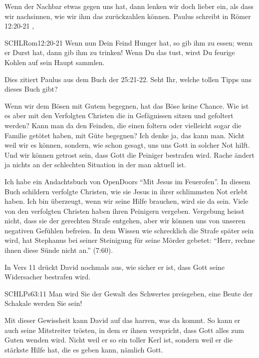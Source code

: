 \documentclass[14pt]{mybib}
\begin{document}
    \begin{otsblock}
    Wenn der Nachbar etwas gegen uns hat, dann lenken wir doch lieber ein, als dass wir nachsinnen, wie wir ihm das zurückzahlen können. Paulus schreibt in Römer 12:20-21 , 
    \begin{bibelbox}{SCHL}{Rom}{12:20-21}
        Wenn nun Dein Feind Hunger hat, so gib ihm zu essen; wenn er Durst hat, dann gib ihm zu trinken! Wenn Du das tust, wirst Du feurige Kohlen auf sein Haupt sammlen.
    \end{bibelbox}
    Dies zitiert Paulus aus dem Buch der  {25:21-22}. Seht Ihr, welche tollen Tipps uns dieses Buch gibt? 

    Wenn wir dem Bösen mit Gutem begegnen, hat das Böse keine Chance. Wie ist es aber mit den Verfolgten Christen die in Gefägnissen sitzen und gefoltert werden? Kann man da den Feinden, die einen foltern oder vielleicht sogar die Familie getötet haben, mit Güte begegnen? Ich denke ja, das kann man. Nicht weil wir es können, sondern, wie schon gesagt, uns uns Gott in solcher Not hilft. Und wir können getrost sein, dass Gott die Peiniger bestrafen wird. Rache ändert ja nichts an der schlechten Situation in der man aktuell ist. 
    
    Ich habe ein Andachtsbuch von OpenDoors \enquote{Mit Jesus im Feuerofen}. In diesem Buch schildern verfolgte Christen, wie sie Jesus in ihrer schlimmsten Not erlebt haben. Ich bin überzeugt, wenn wir seine Hilfe brauchen, wird sie da sein. Viele von den verfolgten Christen haben ihren Peinigern vergeben. Vergebung heisst nicht, dass sie der gerechten Strafe entgehen, aber wir können uns von unseren negativen Gefühlen befreien. In dem Wissen wie schrecklich die Strafe später sein wird, hat Stephanus bei seiner Steinigung für seine Mörder gebetet: \enquote{Herr, rechne ihnen diese Sünde nicht an.} (7:60).
\end{otsblock}
\begin{otsblock}
    In Vers 11 drückt David nochmals aus, wie sicher er ist, dass Gott seine Widersacher bestrafen wird.
    \begin{bibelbox}{SCHL}{Ps}{63:11}
        Man wird Sie der Gewalt des Schwertes preisgeben, eine Beute der Schakale werden Sie sein!
    \end{bibelbox}
    Mit dieser Gewissheit kann David auf das harren, was da kommt. So kann er auch seine Mitstreiter trösten, in dem er ihnen verspricht, dass Gott alles zum Guten wenden wird. 
    Nicht weil er so ein toller Kerl ist, sondern weil er die stärkste Hilfe hat, die es geben kann, nämlich Gott. 
\end{otsblock}
\end{document}
